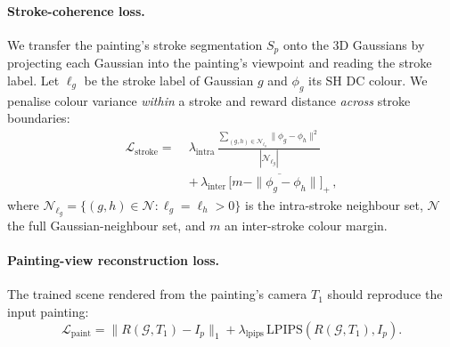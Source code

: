 \paragraph{Stroke-coherence loss.}
We transfer the painting's stroke segmentation $S_p$ onto the 3D Gaussians by
projecting each Gaussian into the painting's viewpoint and reading the stroke
label. Let $\ell_g$ be the stroke label of Gaussian $g$ and $\phi_g$ its SH
DC colour. We penalise colour variance \emph{within} a stroke and reward
distance \emph{across} stroke boundaries:
\begin{align}
\mathcal{L}_\text{stroke} =\; & \lambda_\text{intra}\,
\frac{\sum_{(g,h)\in \mathcal{N}_{\ell_g}} \|\phi_g\!-\!\phi_h\|^2}
{|\mathcal{N}_{\ell_g}|} \nonumber\\
& +\, \lambda_\text{inter}\,
\overline{\big[m - \|\phi_g\!-\!\phi_h\|\big]_+}\,,
\end{align}
where $\mathcal{N}_{\ell_g}=\{(g,h)\!\in\!\mathcal{N}\!:\!\ell_g\!=\!\ell_h\!>\!0\}$
is the intra-stroke neighbour set, $\mathcal{N}$ the full Gaussian-neighbour
set, and $m$ an inter-stroke colour margin.

\paragraph{Painting-view reconstruction loss.}
The trained scene rendered from the painting's camera $T_1$ should reproduce
the input painting:
\begin{equation}
\mathcal{L}_\text{paint} = \|R(\mathcal{G}, T_1) - I_p\|_1 + \lambda_\text{lpips}\,
\mathrm{LPIPS}(R(\mathcal{G}, T_1), I_p).
\end{equation}

